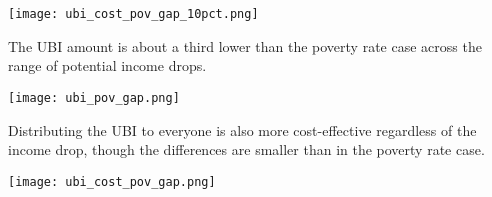 \documentclass[12pt]{article}
\begin{document}
\begin{center}
\texttt{[image: ubi\_cost\_pov\_gap\_10pct.png]}
\label{fig:poverty}
\end{center}

The UBI amount is about a third lower than the poverty rate case across the range of potential income drops.

\begin{center}
\texttt{[image: ubi\_pov\_gap.png]}
\label{fig:poverty}
\end{center}

Distributing the UBI to everyone is also more cost-effective regardless of the income drop, though the differences are smaller than in the poverty rate case.

\begin{center}
\texttt{[image: ubi\_cost\_pov\_gap.png]}
\label{fig:poverty}
\end{center}



\clearpage

\end{document}
